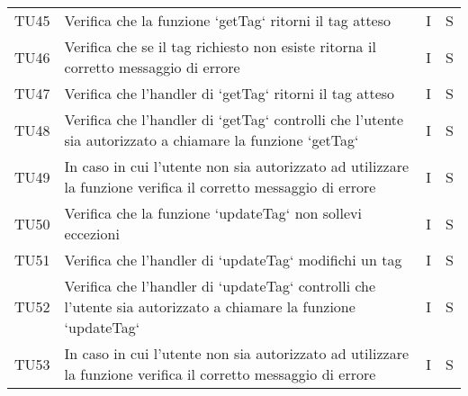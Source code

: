 \begin{center}
\begin{longtable}[!h]{p{45px} p{255px} p{35px} p{35px}}
        TU45          & Verifica che la funzione `getTag` ritorni il tag atteso   & I & S \\ 
        TU46 & Verifica che se il tag richiesto non esiste ritorna il corretto messaggio di errore & I & S \\                                                                                                                               
        TU47          & Verifica che l'handler di `getTag` ritorni il tag atteso                                                                                                                                         & I              & S              \\
        TU48          & Verifica che l'handler di `getTag` controlli che l'utente sia autorizzato a chiamare la funzione `getTag`                                                                                        & I              & S              \\
        TU49 & In caso in cui l'utente non sia autorizzato ad utilizzare la funzione verifica il corretto messaggio di errore & I & S \\

        TU50          & Verifica che la funzione `updateTag` non sollevi eccezioni                                                                                                                                       & I              & S              \\
        TU51          & Verifica che l'handler di `updateTag` modifichi un tag                                                                                                                                           & I              & S              \\
        TU52          & Verifica che l'handler di `updateTag` controlli che l'utente sia autorizzato a chiamare la funzione `updateTag`                                                                                        & I              & S              \\
        TU53 & In caso in cui l'utente non sia autorizzato ad utilizzare la funzione verifica il corretto messaggio di errore & I & S \\


\end{longtable}
\end{center}
